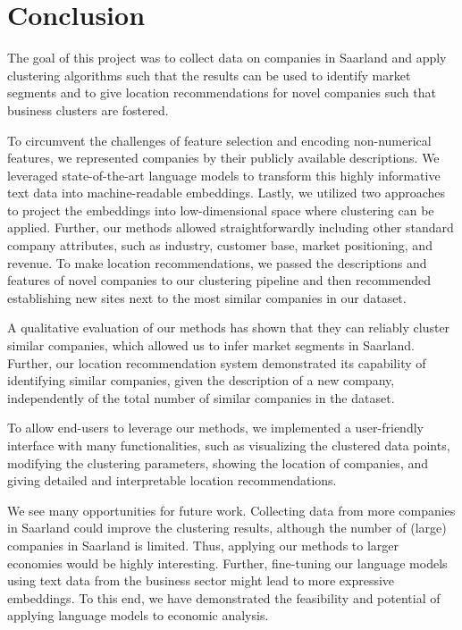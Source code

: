 \documentclass[conference]{IEEEtran}
\begin{document}
\section{Conclusion}
The goal of this project was to collect data on companies in Saarland and apply clustering algorithms such that the results can be used to identify market segments and to give location recommendations for novel companies such that business clusters are fostered.

To circumvent the challenges of feature selection and encoding non-numerical features, we represented companies by their publicly available descriptions. We leveraged state-of-the-art language models to transform this highly informative text data into machine-readable embeddings. Lastly, we utilized two approaches to project the embeddings into low-dimensional space where clustering can be applied.
Further, our methods allowed straightforwardly including other standard company attributes, such as industry, customer base, market positioning, and revenue. 
To make location recommendations, we passed the descriptions and features of novel companies to our clustering pipeline and then recommended establishing new sites next to the most similar companies in our dataset.

A qualitative evaluation of our methods has shown that they can reliably cluster similar companies, which allowed us to infer market segments in Saarland. Further, our location recommendation system demonstrated its capability of identifying similar companies, given the description of a new company, independently of the total number of similar companies in the dataset.

To allow end-users to leverage our methods, we implemented a user-friendly interface with many functionalities, such as visualizing the clustered data points, modifying the clustering parameters, showing the location of companies, and giving detailed and interpretable location recommendations.

We see many opportunities for future work. Collecting data from more companies in Saarland could improve the clustering results, although the number of (large) companies in Saarland is limited. Thus, applying our methods to larger economies would be highly interesting. Further, fine-tuning our language models using text data from the business sector might lead to more expressive embeddings.
To this end, we have demonstrated the feasibility and potential of applying language models to economic analysis.
\end{document}
